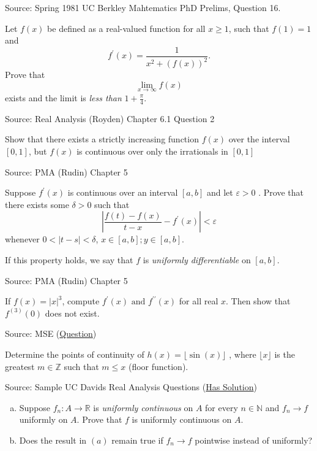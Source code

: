 \documentclass[letterpaper,twoside]{book}
\newcounter{ex}
\begin{document}
\begin{que}
		Source: Spring 1981 UC Berkley Mahtematics PhD Prelims, Question 16.

Let $f(x)$ be defined as a real-valued function for all $x\ge 1$, such that $f(1)=1$ and \[f^\prime(x) = \frac{1}{x^2 + (f(x))^2}.\]
Prove that \[\lim_{x\to\infty}f(x)\] exists and the limit is \emph{less than} $1+\frac{\pi}{4}$. 
\end{que}	
\begin{que}
Source: Real Analysis (Royden) Chapter 6.1 Question 2

Show that there exists a strictly increasing function $f(x)$ over the interval $[0,1]$, but $f(x)$ is continuous over only the irrationals in $[0,1]$ 
\end{que}	
\begin{que}
Source: PMA (Rudin) Chapter 5

Suppose $f^\prime(x)$ is continuous over an interval $[a,b]$ and let $\varepsilon>0$ . Prove that there exists some $\delta>0$ such that 
\[\left|\frac{f(t)-f(x)}{t-x}- f^\prime(x)\right|<\varepsilon\]
whenever $0<\left|t-s\right|<\delta$, $x\in [a,b]; y\in [a,b]$.

If this property holds, we say that $f$ is \emph{uniformly differentiable} on $[a,b]$.
\end{que}	
\begin{que}
Source: PMA (Rudin) Chapter 5

If $f(x) = \left|x\right|^3$, compute $f^\prime(x) \text{ and } f^{\prime\prime}(x)$  for all real $x$. Then show that $f^{(3)}(0)$ does not exist. 
\end{que}	
\begin{que}
		Source: MSE (\href{https://math.stackexchange.com/questions/4797989/determine-the-points-of-continuity-of-hx-lfloor-sinx-rfloor}{Question})

Determine the points of continuity of $h(x)=\lfloor \sin(x)\rfloor$ , where $\lfloor x \rfloor$  is the greatest $m\in\mathbb{Z}$ such that $m\le x$  (floor function).
\end{que}	
\begin{que}
		Source: Sample UC Davids Real Analysis Questions (\href{https://www.math.ucdavis.edu/~hunter/m125a/m125a_sample_final_solutions.pdf}{Has Solution})

		\begin{enumerate}[(a)]
				\item Suppose $f_n\colon A \to \mathbb{R}$ is \emph{uniformly continuous} on $A$ for every $n\in\mathbb{N}$ and $f_n\to f$ uniformly on $A$.
						Prove that $f$ is uniformly continuous on $A$. 
				\item Does the result in $(a)$ remain true if $f_n\to f$ pointwise instead of uniformly?
		\end{enumerate}	
\end{que}	
\end{document}
